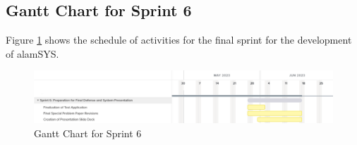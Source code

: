 \subsection{Gantt Chart for Sprint 6}
\label{subsec:gantt_chart_sprint6}
Figure \ref{fig:gantt_chart_sprint6} shows the schedule of activities for the final sprint 
for the development of alamSYS.
\begin{figure}[ht]
    \centering
    \includegraphics[width=1\textwidth]{./assets/Chapter_3/Gantt/Gantt_Chart_Sprint6.png}
    \caption{Gantt Chart for Sprint 6}
    \label{fig:gantt_chart_sprint6}
\end{figure}
\FloatBarrier